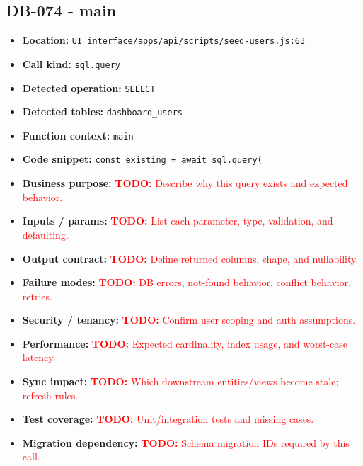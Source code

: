 \documentclass[11pt]{article}
\newcommand{\todoitem}[1]{\textcolor{red}{\textbf{TODO:} #1}}
\begin{document}
\subsection{DB-074 - main}
\begin{itemize}[leftmargin=1.5em]
\item \textbf{Location:} \texttt{UI interface/apps/api/scripts/seed-users.js:63}
\item \textbf{Call kind:} \texttt{sql.query}
\item \textbf{Detected operation:} \texttt{SELECT}
\item \textbf{Detected tables:} \texttt{dashboard\_users}
\item \textbf{Function context:} \texttt{main}
\item \textbf{Code snippet:} \texttt{const existing = await sql.query(}
\item \textbf{Business purpose:} \todoitem{Describe why this query exists and expected behavior.}
\item \textbf{Inputs / params:} \todoitem{List each parameter, type, validation, and defaulting.}
\item \textbf{Output contract:} \todoitem{Define returned columns, shape, and nullability.}
\item \textbf{Failure modes:} \todoitem{DB errors, not-found behavior, conflict behavior, retries.}
\item \textbf{Security / tenancy:} \todoitem{Confirm user scoping and auth assumptions.}
\item \textbf{Performance:} \todoitem{Expected cardinality, index usage, and worst-case latency.}
\item \textbf{Sync impact:} \todoitem{Which downstream entities/views become stale; refresh rules.}
\item \textbf{Test coverage:} \todoitem{Unit/integration tests and missing cases.}
\item \textbf{Migration dependency:} \todoitem{Schema migration IDs required by this call.}
\end{itemize}
\end{document}
